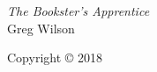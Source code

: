 \documentclass[12pt,letter]{memoir}
\begin{document}
\pagestyle{empty}

{\begingroup
  \raggedleft
  \vspace*{\baselineskip}
  {\Huge\itshape The Bookster's Apprentice}\\[0.2\textheight]
  {\large Greg Wilson}\par
  \vfill
  {\large Copyright {\copyright} 2018}
\endgroup}

\newpage

\pagestyle{empty}

~

\newpage

\pagestyle{plain}
\linespread{1.05}\selectfont

\end{document}

